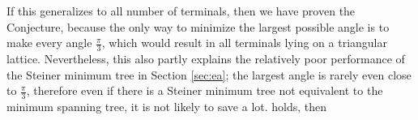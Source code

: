 \documentclass{mpaper}
\begin{document}
If this generalizes to all number of terminals, then we have proven the Conjecture, because the only way to minimize the largest possible angle is to make every angle $\frac{\pi}{3}$, which would result in all terminals lying on a triangular lattice. Nevertheless, this also partly explains the relatively poor performance of the Steiner minimum tree in Section \ref{sec:ea}; the largest angle is rarely even close to $\frac{\pi}{3}$, therefore even if there is a Steiner minimum tree not equivalent to the minimum spanning tree, it is not likely to save a lot.
holds, then 
\end{document}
